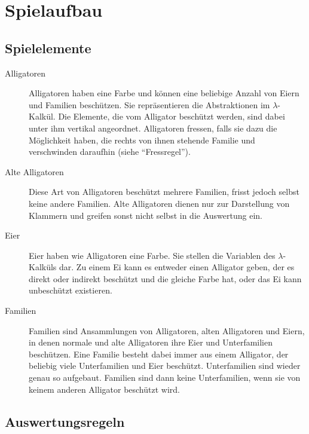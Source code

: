 \section{Spielaufbau}

\subsection{Spielelemente}

	\begin{description}
		\item[Alligatoren] Alligatoren haben eine Farbe und können eine beliebige Anzahl von Eiern und Familien beschützen.
		Sie repräsentieren die Abstraktionen im \(\lambda\)-Kalkül.
		Die Elemente, die vom Alligator beschützt werden, sind dabei unter ihm vertikal angeordnet.
		Alligatoren fressen, falls sie dazu die Möglichkeit haben, die rechts von ihnen stehende Familie und verschwinden daraufhin (siehe "`Fressregel"').

		\item[Alte Alligatoren] Diese Art von Alligatoren beschützt mehrere Familien, frisst jedoch selbst keine andere Familien.
		Alte Alligatoren dienen nur zur Darstellung von Klammern und greifen sonst nicht selbst in die Auswertung ein.

		\item[Eier] Eier haben wie Alligatoren eine Farbe.
		Sie stellen die Variablen des \(\lambda\)-Kalküls dar.
		Zu einem Ei kann es entweder einen Alligator geben, der es direkt oder indirekt beschützt und die gleiche Farbe hat, oder das Ei kann unbeschützt existieren.

		\item[Familien] Familien sind Ansammlungen von Alligatoren, alten Alligatoren und Eiern, in denen normale und alte Alligatoren ihre Eier und Unterfamilien beschützen.
		Eine Familie besteht dabei immer aus einem Alligator, der beliebig viele Unterfamilien und Eier beschützt.
		Unterfamilien sind wieder genau so aufgebaut.
		Familien sind dann keine Unterfamilien, wenn sie von keinem anderen Alligator beschützt wird.

	\end{description}

\subsection{Auswertungsregeln}

